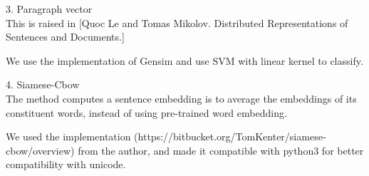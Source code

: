 3. Paragraph vector\\

	This is raised in [Quoc Le and Tomas Mikolov. Distributed Representations of Sentences and Documents.] 

We use the implementation of Gensim and use SVM with linear kernel to classify. 

4. Siamese-Cbow\\

	The method computes a sentence embedding is to average the embeddings of its
constituent words, instead of using pre-trained word embedding.

	We used the implementation (https://bitbucket.org/TomKenter/siamese-cbow/overview) from the author, and made it compatible with python3 for better compatibility with unicode. 
